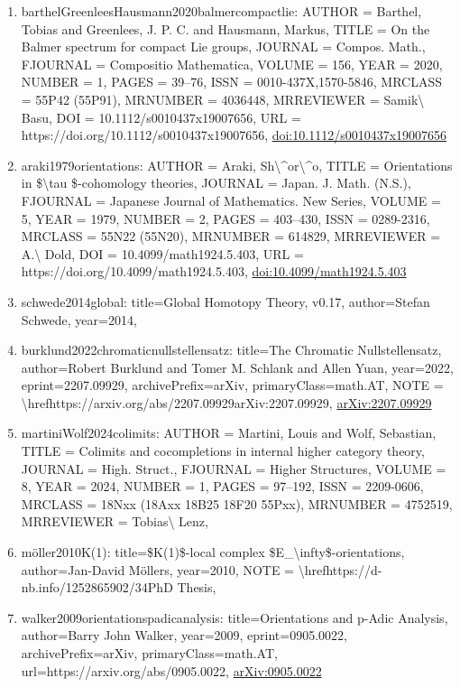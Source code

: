 \documentclass[11pt]{article}
\begin{document}
\begin{enumerate}[leftmargin=*]
  \item barthelGreenleesHausmann2020balmercompactlie: AUTHOR = Barthel, Tobias and Greenlees, J. P. C. and Hausmann, Markus, TITLE = On the Balmer spectrum for compact Lie groups, JOURNAL = Compos. Math., FJOURNAL = Compositio Mathematica, VOLUME = 156, YEAR = 2020, NUMBER = 1, PAGES = 39--76, ISSN = 0010-437X,1570-5846, MRCLASS = 55P42 (55P91), MRNUMBER = 4036448, MRREVIEWER = Samik\textbackslash{} Basu, DOI = 10.1112/s0010437x19007656, URL = https://doi.org/10.1112/s0010437x19007656, \href{https://doi.org/10.1112/s0010437x19007656}{doi:10.1112/s0010437x19007656}
  \item araki1979orientations: AUTHOR = Araki, Sh\textbackslash{}\^{}or\textbackslash{}\^{}o, TITLE = Orientations in \$\textbackslash{}tau \$-cohomology theories, JOURNAL = Japan. J. Math. (N.S.), FJOURNAL = Japanese Journal of Mathematics. New Series, VOLUME = 5, YEAR = 1979, NUMBER = 2, PAGES = 403--430, ISSN = 0289-2316, MRCLASS = 55N22 (55N20), MRNUMBER = 614829, MRREVIEWER = A.\textbackslash{} Dold, DOI = 10.4099/math1924.5.403, URL = https://doi.org/10.4099/math1924.5.403, \href{https://doi.org/10.4099/math1924.5.403}{doi:10.4099/math1924.5.403}
  \item schwede2014global: title=Global Homotopy Theory, v0.17, author=Stefan Schwede, year=2014,
  \item burklund2022chromaticnullstellensatz: title=The Chromatic Nullstellensatz, author=Robert Burklund and Tomer M. Schlank and Allen Yuan, year=2022, eprint=2207.09929, archivePrefix=arXiv, primaryClass=math.AT, NOTE = \textbackslash{}hrefhttps://arxiv.org/abs/2207.09929arXiv:2207.09929, \href{https://arxiv.org/abs/2207.09929}{arXiv:2207.09929}
  \item martiniWolf2024colimits: AUTHOR = Martini, Louis and Wolf, Sebastian, TITLE = Colimits and cocompletions in internal higher category theory, JOURNAL = High. Struct., FJOURNAL = Higher Structures, VOLUME = 8, YEAR = 2024, NUMBER = 1, PAGES = 97--192, ISSN = 2209-0606, MRCLASS = 18Nxx (18Axx 18B25 18F20 55Pxx), MRNUMBER = 4752519, MRREVIEWER = Tobias\textbackslash{} Lenz,
  \item möller2010K(1): title=\$K(1)\$-local complex \$E\_\textbackslash{}infty\$-orientations, author=Jan-David Möllers, year=2010, NOTE = \textbackslash{}hrefhttps://d-nb.info/1252865902/34PhD Thesis,
  \item walker2009orientationspadicanalysis: title=Orientations and p-Adic Analysis, author=Barry John Walker, year=2009, eprint=0905.0022, archivePrefix=arXiv, primaryClass=math.AT, url=https://arxiv.org/abs/0905.0022, \href{https://arxiv.org/abs/0905.0022}{arXiv:0905.0022}

\end{enumerate}
\end{document}

